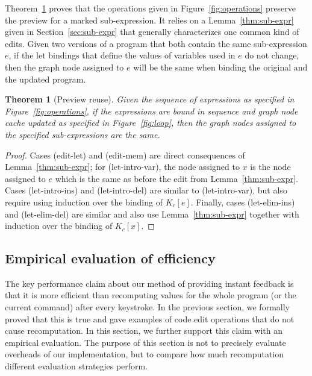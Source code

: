 \documentclass[english,crc]{programming}
\newcounter{thc}
\theoremstyle{plain}
\newtheorem{theorem}[thc]{Theorem}
\theoremstyle{definition}
\newcommand{\rname}[1]{{\sffamily(#1)}}
\begin{document}
Theorem~\ref{thm:preview-reuse} proves that the operations given in Figure~\ref{fig:operations}
preserve the preview for a marked sub-expression. It relies on a Lemma~\ref{thm:sub-expr} given in
Section~\ref{sec:sub-expr} that generally characterizes one common kind of edits. Given two versions
of a program that both contain the same sub-expression $e$, if the let bindings that define the values of
variables used in $e$ do not change, then the graph node assigned to $e$ will be the same
when binding the original and the updated program.



\begin{theorem}[Preview reuse]
\label{thm:preview-reuse}
Given the sequence of expressions as specified in Figure~\ref{fig:operations}, if the expressions
are bound in sequence and graph node cache updated as specified in Figure~\ref{fig:loop}, then
the graph nodes assigned to the specified sub-expressions are the same.
\end{theorem}
\begin{proof}
Cases \rname{edit-let} and \rname{edit-mem} are direct consequences of Lemma~\ref{thm:sub-expr};
for \rname{let-intro-var}, the node assigned to $x$ is the node assigned to $e$ which is the
same as before the edit from Lemma~\ref{thm:sub-expr}.
Cases \rname{let-intro-ins} and \rname{let-intro-del} are similar to \rname{let-intro-var}, but
also require using induction over the binding of $K_c[e]$. Finally, cases \rname{let-elim-ins}
and \rname{let-elim-del} are similar and also use Lemma~\ref{thm:sub-expr}
together with induction over the binding of $K_c[x]$.
\end{proof}


\subsection{Empirical evaluation of efficiency}
\label{sec:evaluation-empirical}

The key performance claim about our method of providing instant feedback is that it is more
efficient than recomputing values for the whole program (or the current command) after every
keystroke. In the previous section, we formally proved that this is true and gave examples of
code edit operations that do not cause recomputation. In this section, we further support this
claim with an empirical evaluation. The purpose of this section is not to precisely evaluate
overheads of our implementation, but to compare how much recomputation different evaluation
strategies perform.
\end{document}
